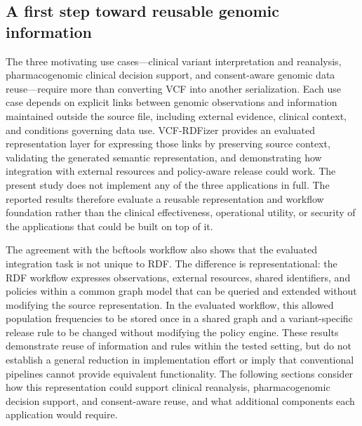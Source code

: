 \documentclass[pdflatex,sn-mathphys-num]{sn-jnl}
\begin{document}
\subsection{A first step toward reusable genomic information}\label{subsec:disc-first-step}
The three motivating use cases---clinical variant interpretation and reanalysis, pharmacogenomic clinical decision support, and consent-aware genomic data reuse---require more than converting VCF into another serialization.
Each use case depends on explicit links between genomic observations and information maintained outside the source file, including external evidence, clinical context, and conditions governing data use.
VCF-RDFizer provides an evaluated representation layer for expressing those links by preserving source context, validating the generated semantic representation, and demonstrating how integration with external resources and policy-aware release could work.
The present study does not implement any of the three applications in full.
The reported results therefore evaluate a reusable representation and workflow foundation rather than the clinical effectiveness, operational utility, or security of the applications that could be built on top of it.

The agreement with the bcftools workflow also shows that the evaluated integration task is not unique to RDF.
The difference is representational: the RDF workflow expresses observations, external resources, shared identifiers, and policies within a common graph model that can be queried and extended without modifying the source representation.
In the evaluated workflow, this allowed population frequencies to be stored once in a shared graph and a variant-specific release rule to be changed without modifying the policy engine.
These results demonstrate reuse of information and rules within the tested setting, but do not establish a general reduction in implementation effort or imply that conventional pipelines cannot provide equivalent functionality.
The following sections consider how this representation could support clinical reanalysis, pharmacogenomic decision support, and consent-aware reuse, and what additional components each application would require.
\end{document}

